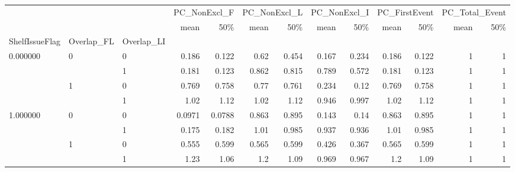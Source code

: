 \begin{tabular}{lllrrrrrrrrrr}
\toprule
 &  &  & \multicolumn{2}{r}{PC\_NonExcl\_F} & \multicolumn{2}{r}{PC\_NonExcl\_L} & \multicolumn{2}{r}{PC\_NonExcl\_I} & \multicolumn{2}{r}{PC\_FirstEvent} & \multicolumn{2}{r}{PC\_Total\_Event} \\
 &  &  & mean & 50\% & mean & 50\% & mean & 50\% & mean & 50\% & mean & 50\% \\
ShelfIssueFlag & Overlap_FL & Overlap_LI &  &  &  &  &  &  &  &  &  &  \\
\midrule
\multirow[t]{4}{*}{0.000000} & \multirow[t]{2}{*}{0} & 0 & 0.186 & 0.122 & 0.62 & 0.454 & 0.167 & 0.234 & 0.186 & 0.122 & 1 & 1 \\
 &  & 1 & 0.181 & 0.123 & 0.862 & 0.815 & 0.789 & 0.572 & 0.181 & 0.123 & 1 & 1 \\
\cline{2-13}
 & \multirow[t]{2}{*}{1} & 0 & 0.769 & 0.758 & 0.77 & 0.761 & 0.234 & 0.12 & 0.769 & 0.758 & 1 & 1 \\
 &  & 1 & 1.02 & 1.12 & 1.02 & 1.12 & 0.946 & 0.997 & 1.02 & 1.12 & 1 & 1 \\
\cline{1-13} \cline{2-13}
\multirow[t]{4}{*}{1.000000} & \multirow[t]{2}{*}{0} & 0 & 0.0971 & 0.0788 & 0.863 & 0.895 & 0.143 & 0.14 & 0.863 & 0.895 & 1 & 1 \\
 &  & 1 & 0.175 & 0.182 & 1.01 & 0.985 & 0.937 & 0.936 & 1.01 & 0.985 & 1 & 1 \\
\cline{2-13}
 & \multirow[t]{2}{*}{1} & 0 & 0.555 & 0.599 & 0.565 & 0.599 & 0.426 & 0.367 & 0.565 & 0.599 & 1 & 1 \\
 &  & 1 & 1.23 & 1.06 & 1.2 & 1.09 & 0.969 & 0.967 & 1.2 & 1.09 & 1 & 1 \\
\cline{1-13} \cline{2-13}
\bottomrule
\end{tabular}
